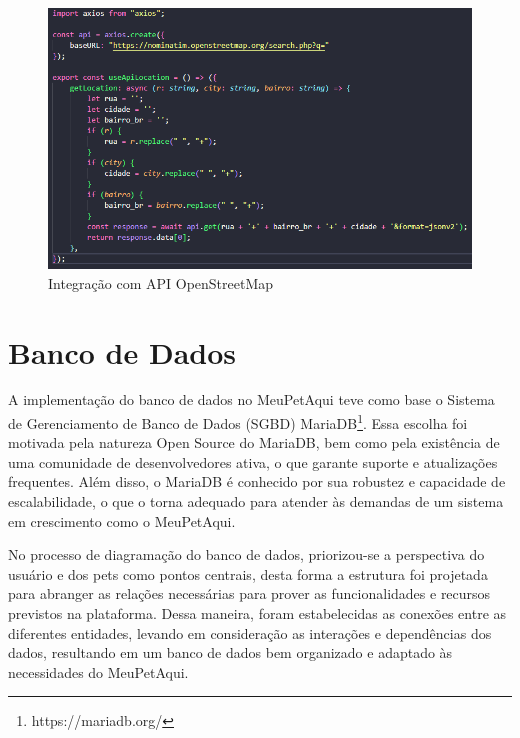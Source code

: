 \begin{figure}[htb]
     \centering
     \includegraphics[width=14cm]{arquivos/Figuras/apigeolocalizacao.png}
     \caption{Integração com API OpenStreetMap}
         \label{fig:OpenStreetMap}
\end{figure}

\newpage
\section{Banco de Dados}

A implementação do banco de dados no MeuPetAqui teve como base o Sistema de Gerenciamento de Banco de Dados (SGBD) MariaDB\footnote{https://mariadb.org/}. Essa escolha foi motivada pela natureza Open Source do MariaDB, bem como pela existência de uma comunidade de desenvolvedores ativa, o que garante suporte e atualizações frequentes. Além disso, o MariaDB é conhecido por sua robustez e capacidade de escalabilidade, o que o torna adequado para atender às demandas de um sistema em crescimento como o MeuPetAqui.

No processo de diagramação do banco de dados, priorizou-se a perspectiva do usuário e dos pets como pontos centrais, desta forma a estrutura foi projetada para abranger as relações necessárias para prover as  funcionalidades e recursos previstos na plataforma. Dessa maneira, foram estabelecidas as conexões entre as diferentes entidades, levando em consideração as interações e dependências dos dados, resultando em um banco de dados bem organizado e adaptado às necessidades do MeuPetAqui. 

